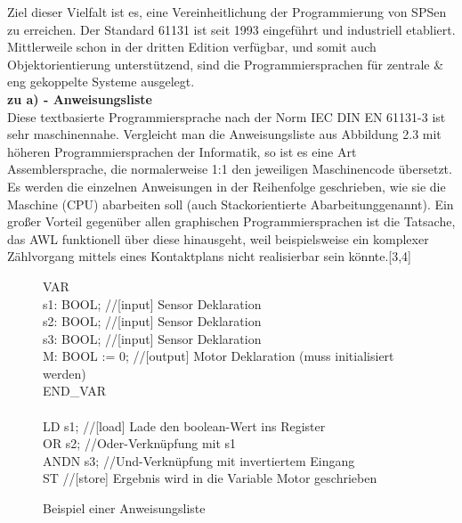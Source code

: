 	Ziel dieser Vielfalt ist es, eine Vereinheitlichung der Programmierung von SPSen zu erreichen. Der Standard 61131 ist seit 1993 eingeführt und industriell etabliert. Mittlerweile schon in der dritten Edition verfügbar, und somit auch Objektorientierung unterstützend, sind die Programmiersprachen für zentrale \& eng gekoppelte Systeme ausgelegt.\\
	
	\textbf{zu a) - Anweisungsliste}\\
	
	Diese textbasierte Programmiersprache nach der Norm IEC DIN EN 61131-3 ist sehr maschinennahe. Vergleicht man die Anweisungsliste aus Abbildung 2.3 mit höheren Programmiersprachen der Informatik, so ist es eine Art Assemblersprache, die normalerweise 1:1 den jeweiligen Maschinencode übersetzt. Es werden die einzelnen Anweisungen in der Reihenfolge geschrieben, wie sie die Maschine (CPU) abarbeiten soll (auch \glqq Stackorientierte Abarbeitung\grqq \space genannt). Ein großer Vorteil gegenüber allen graphischen Programmiersprachen ist die Tatsache, das AWL funktionell über diese hinausgeht, weil beispielsweise ein komplexer Zählvorgang mittels eines Kontaktplans nicht realisierbar sein könnte.[3,4]\\
	
	\begin{figure}
		\begin{framed}
			VAR\\
			s1: BOOL; \color{gray}//[input] Sensor Deklaration\\ \color{black}
			s2: BOOL; \color{gray}//[input] Sensor Deklaration\\ \color{black}
			s3: BOOL; \color{gray}//[input] Sensor Deklaration\\ \color{black}
			M: BOOL := 0; \color{gray}//[output] Motor Deklaration (muss initialisiert werden)\\ \color{black}
			END\_VAR\\\\
			LD s1; \color{gray}//[load] Lade den boolean-Wert ins Register\\ \color{black}
			OR s2; \color{gray}//Oder-Verknüpfung mit s1\\ \color{black}
			ANDN s3; \color{gray}//Und-Verknüpfung mit invertiertem Eingang\\ \color{black}
			ST \color{gray}//[store] Ergebnis wird in die Variable Motor geschrieben\\
		\end{framed}
		\caption{Beispiel einer Anweisungsliste}
	\end{figure}
		
